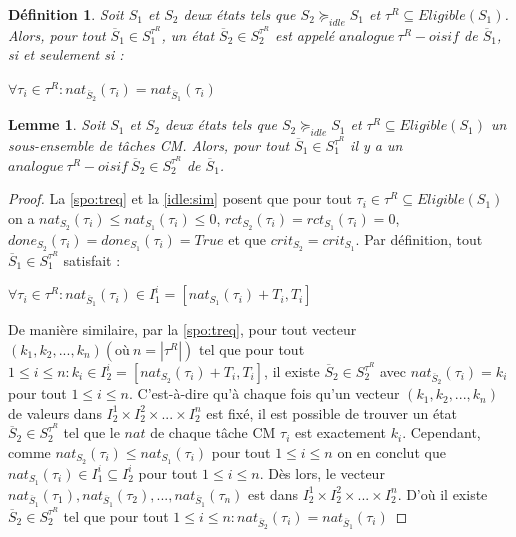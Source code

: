 \documentclass[12pt,a4paper,oneside]{book}
\theoremstyle{break}
\newtheorem{defin}{Définition}[chapter]
\theoremstyle{breakplain}
\newtheorem{lem}{Lemme}[chapter]
\begin{document}
\begin{defin}
\label{idle:reqanalogue}
Soit $S_1$ et $S_2$ deux états tels que $S_2 \succeq_{idle} S_1$ et $\tau^R \subseteq Eligible(S_1)$. Alors, pour tout $\overline{S}_1\in S_1^{\tau^R}$, un état  $\overline{S}_2\in S_2^{\tau^R}$ est appelé $analogue\ \tau^R-oisif$ de $\overline{S}_1$, si et seulement si :
\begin{center}
$\forall \tau_i \in \tau^R : nat_{\overline{S}_2}(\tau_i) = nat_{\overline{S}_1}(\tau_i) $
\end{center}
\end{defin}

\begin{lem}
\label{reqanalogueeq}
Soit $S_1$ et $S_2$ deux états tels que $S_2 \succeq_{idle} S_1$ et $\tau^R \subseteq Eligible(S_1)$ un sous-ensemble de tâches CM. Alors, pour tout $\overline{S}_1 \in S_1^{\tau^R}$ il y a un $analogue\ \tau^R-oisif\ \overline{S}_2 \in S_2^{\tau^R}$ de $\overline{S}_1$.
\end{lem}

\begin{proof}
La \autoref{spo:treq} et la \autoref{idle:sim} posent que pour tout $\tau_i \in \tau^R \subseteq Eligible(S_1)$ on a $nat_{S_2}(\tau_i) \leq nat_{S_1}(\tau_i) \leq 0$, $rct_{S_2}(\tau_i) = rct_{S_1}(\tau_i) = 0$, $done_{S_2}(\tau_i) = done_{S_1}(\tau_i) = True$ et que $crit_{S_2} = crit_{S_1}$. Par définition, tout $\overline{S}_1 \in S^{\tau^R}_1$ satisfait :

\begin{center}
$\forall \tau_i \in \tau^R : nat_{\overline{S}_1}(\tau_i) \in I^i_1=[nat_{S_1}(\tau_i)+T_i, T_i] $
\end{center}

De manière similaire, par la \autoref{spo:treq}, pour tout vecteur $(k_1, k_2, ..., k_n)(\mbox{où}\ n = |\tau^R|)$ tel que pour tout $1\leq i \leq n: k_i \in I^i_2=[nat_{S_2}(\tau_i)+T_i, T_i]$, il existe $\overline{S}_2\in S^{\tau^R}_2$ avec $nat_{\overline{S}_2}(\tau_i) = k_i$ pour tout $1\leq i \leq n$. C'est-à-dire qu'à chaque fois qu'un vecteur $(k_1, k_2, ..., k_n)$ de valeurs dans $I_2^1 \times I_2^2 \times ... \times I_2^n$ est fixé, il est possible de trouver un état $\overline{S}_2 \in S^{\tau^R}_2$ tel que le $nat$ de chaque tâche CM $\tau_i$ est exactement $k_i$. Cependant, comme $nat_{S_2}(\tau_i) \leq nat_{S_1}(\tau_i)$ pour tout $1\leq i \leq n$ on en conclut que $nat_{S_1}(\tau_i) \in I^i_1 \subseteq I^i_2$ pour tout $1\leq i \leq n$. Dès lors, le vecteur $nat_{\overline{S}_1}(\tau_1), nat_{\overline{S}_1}(\tau_2), ..., nat_{\overline{S}_1}(\tau_n)$ est dans $I_2^1 \times I_2^2 \times ... \times I_2^n$. D'où il existe $\overline{S}_2 \in S^{\tau^R}_2$ tel que pour tout $1\leq i \leq n : nat_{\overline{S}_2}(\tau_i) = nat_{\overline{S}_1}(\tau_i)$
\end{proof}
\end{document}
